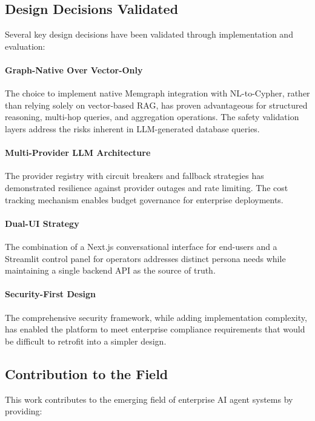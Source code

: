 \subsection{Design Decisions Validated}

Several key design decisions have been validated through implementation and evaluation:

\paragraph{Graph-Native Over Vector-Only}
The choice to implement native Memgraph integration with NL-to-Cypher, rather than relying solely on vector-based RAG, has proven advantageous for structured reasoning, multi-hop queries, and aggregation operations. The safety validation layers address the risks inherent in LLM-generated database queries.

\paragraph{Multi-Provider LLM Architecture}
The provider registry with circuit breakers and fallback strategies has demonstrated resilience against provider outages and rate limiting. The cost tracking mechanism enables budget governance for enterprise deployments.

\paragraph{Dual-UI Strategy}
The combination of a Next.js conversational interface for end-users and a Streamlit control panel for operators addresses distinct persona needs while maintaining a single backend API as the source of truth.

\paragraph{Security-First Design}
The comprehensive security framework, while adding implementation complexity, has enabled the platform to meet enterprise compliance requirements that would be difficult to retrofit into a simpler design.

\subsection{Contribution to the Field}

This work contributes to the emerging field of enterprise AI agent systems by providing:

